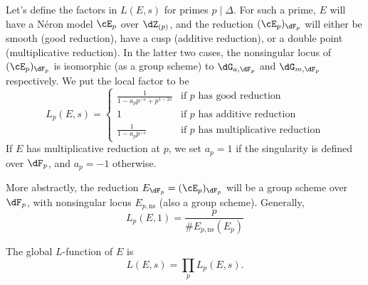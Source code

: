 \documentclass{article}
\begin{document}
Let's define the factors in $L(E,s)$ for primes $p\mid \Delta$. For such a 
prime, $E$ will have a N\'eron model $\cE_p$ over $\dZ_{(p)}$, and the 
reduction $(\cE_p)_{\dF_p}$ will either be smooth (good reduction), have a 
cusp (additive reduction), or a double point (multiplicative reduction). In the 
latter two cases, the nonsingular locus of $(\cE_p)_{\dF_p}$ is isomorphic (as 
a group scheme) to $\dG_{a,\dF_p}$ and $\dG_{m,\dF_p}$ respectively. 
We put the local factor to be 
\[
  L_p(E,s) = \begin{cases}
               \frac{1}{1-a_p p^{-s} + p^{1-2 s}} & \text{if $p$ has good reduction} \\
               1 & \text{if $p$ has additive reduction} \\
               \frac{1}{1-a_p p^{-s}} & \text{if $p$ has multiplicative reduction}
             \end{cases}
\]
If $E$ has multiplicative reduction at $p$, we set $a_p=1$ if the singularity 
is defined over $\dF_p$, and $a_p=-1$ otherwise. 

More abstractly, the reduction $E_{\dF_p} = (\cE_p)_{\dF_p}$ will be a group 
scheme over $\dF_p$, with nonsingular locus $E_{p,\text{ns}}$ (also a group 
scheme). Generally, 
\[
  L_p(E,1) = \frac{p}{\# E_{p,\text{ns}}(E_p)}
\]

The global $L$-function of $E$ is 
\[
  L(E,s) = \prod_p L_p(E,s) \text{.}
\]







\end{document}
